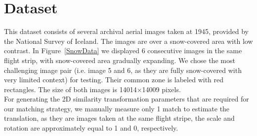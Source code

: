 \section{Dataset}
This dataset consists of several archival aerial images taken at 1945, provided by the National Survey of Iceland. The images are over a snow-covered area with low contrast. In Figure~\ref{SnowData} we displayed 6 consecutive images in the same flight strip, with snow-covered area gradually expanding. We chose the most challenging image pair (i.e. image 5 and 6, as they are fully snow-covered with very limited context) for testing. Their common zone is labeled with red rectangles. The size of both images is 14014$\times$14009 pixels.\\
For generating the 2D similarity transformation parameters that are required for our matching strategy, we manually measure only 1 match to estimate the translation, as they are images taken at the same flight stripe, the scale and rotation are approximately equal to 1 and 0, respectively.\\

